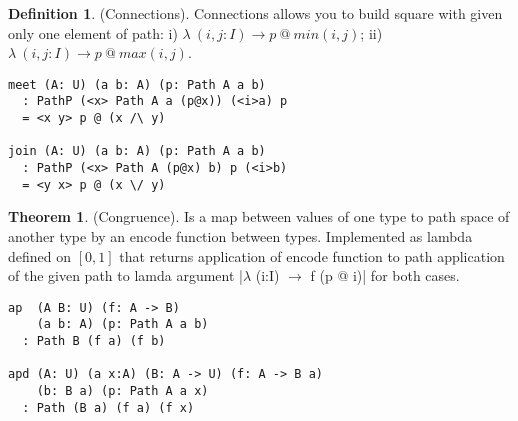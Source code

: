 \documentclass[twocolumn,10pt]{article}
\theoremstyle{definition}
\newtheorem{theorem}{Theorem}
\newtheorem{definition}{Definition}
\begin{document}
\begin{definition} (Connections).
Connections allows you to build square
with given only one element of path: i) $\lambda\ (i,j: I) \rightarrow p\ @\ min(i,j)$;
ii) $\lambda\ (i,j:I) \rightarrow p\ @\ max(i,j)$.
\begin{center}
\end{center}
\begin{lstlisting}
meet (A: U) (a b: A) (p: Path A a b)
  : PathP (<x> Path A a (p@x)) (<i>a) p
  = <x y> p @ (x /\ y)

join (A: U) (a b: A) (p: Path A a b)
  : PathP (<x> Path A (p@x) b) p (<i>b)
  = <y x> p @ (x \/ y)
\end{lstlisting}
\end{definition}

\begin{theorem} (Congruence).
Is a map between values of one type
to path space of another type by an encode function between types.
Implemented as lambda defined on $[0,1]$ that returns
application of encode function to path application of
the given path to lamda argument |$\lambda$ (i:I) $\rightarrow$ f (p @ i)|
for both cases.
\begin{lstlisting}
ap  (A B: U) (f: A -> B)
    (a b: A) (p: Path A a b)
  : Path B (f a) (f b)

apd (A: U) (a x:A) (B: A -> U) (f: A -> B a)
    (b: B a) (p: Path A a x)
  : Path (B a) (f a) (f x)
\end{lstlisting}
\end{theorem}
\end{document}
